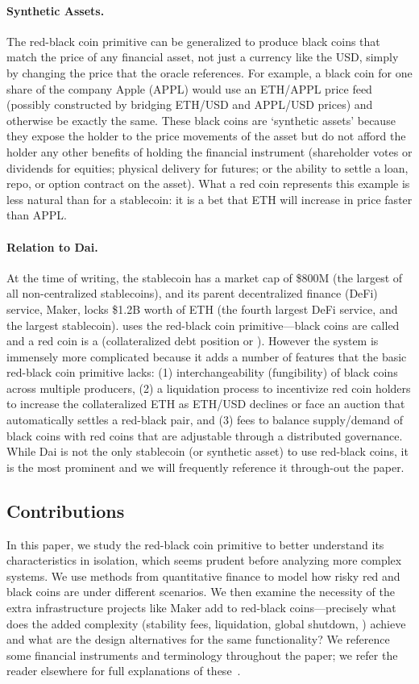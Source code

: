 \paragraph{Synthetic Assets.} The red-black coin primitive can be generalized to produce black coins that match the price of any financial asset, not just a currency like the USD, simply by changing the price that the oracle references. For example, a black coin for one share of the company Apple (APPL) would use an ETH/APPL price feed (possibly constructed by bridging ETH/USD and APPL/USD prices) and otherwise be exactly the same. These black coins are `synthetic assets' because they expose the holder to the price movements of the asset but do not afford the holder any other benefits of holding the financial instrument (\eg shareholder votes or dividends for equities; physical delivery for futures; or the ability to settle a loan, repo, or option contract on the asset). What a red coin represents this example is less natural than for a stablecoin: it is a bet that ETH will increase in price faster than APPL.

\paragraph{Relation to Dai.} At the time of writing, the stablecoin \dai has a market cap of \$800M (the largest of all non-centralized stablecoins), and its parent decentralized finance (DeFi) service, Maker, locks \$1.2B worth of ETH (the fourth largest DeFi service, and the largest stablecoin). \dai uses the red-black coin primitive---black coins are called \dai and a red coin is a \vault (\nee collateralized debt position or \cdp). However the system is immensely more complicated because it adds a number of features that the basic red-black coin primitive lacks: (1) interchangeability (fungibility) of black coins across multiple producers, (2) a liquidation process to incentivize red coin holders to increase the collateralized ETH as ETH/USD declines or face an auction that automatically settles a red-black pair, and (3) fees to balance supply/demand of black coins with red coins that are adjustable through a distributed governance. While Dai is not the only stablecoin (or synthetic asset) to use red-black coins, it is the most prominent and we will frequently reference it through-out the paper.

\subsection{Contributions} In this paper, we study the red-black coin primitive to better understand its characteristics in isolation, which seems prudent before analyzing more complex systems. We use methods from quantitative finance to model how risky red and black coins are under different scenarios. We then examine the necessity of the extra infrastructure projects like Maker add to red-black coins---precisely what does the added complexity (\eg stability fees, liquidation, global shutdown, \etc) achieve and what are the design alternatives for the same functionality? We reference some financial instruments and terminology throughout the paper; we refer the reader elsewhere for full explanations of these~\cite{Har03}.

